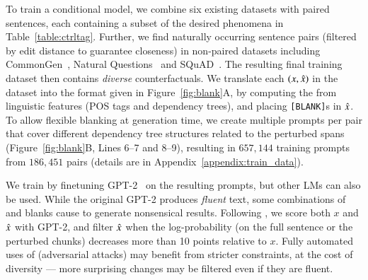 

To train a conditional model, we combine six existing datasets with paired sentences, each containing a subset of the desired phenomena in Table~\ref{table:ctrltag}. 
Further, we find naturally occurring sentence pairs (filtered by edit distance to guarantee closeness) in non-paired datasets including CommonGen~\cite{lin-etal-2020-commongen}, Natural Questions~\cite{kwiatkowski-etal-2019-natural} and SQuAD~\cite{rajpurkar-etal-2016-squad}. 
The resulting final training dataset then contains \emph{diverse} counterfactuals.
We translate each $(x, \hat{x})$ in the dataset into the format given in Figure~\ref{fig:blank}A, by computing the \tagstr from linguistic features (POS tags and dependency trees), and placing \texttt{[BLANK]}s in $\hat{x}$. 
To allow flexible blanking at generation time, we create multiple prompts per pair that cover  different dependency tree structures related to the perturbed spans (Figure~\ref{fig:blank}B, Lines 6--7 and 8--9), resulting in $657,144$ training prompts from $186,451$ pairs (details are in Appendix~\ref{appendix:train_data}).

We train \sysname by finetuning GPT-2~\cite{radford2019language} on the resulting prompts, but other LMs can also be used.
While the original GPT-2 produces \emph{fluent} text, some combinations of \tagstrs and blanks cause \sysname to generate nonsensical results.
Following \citet{morris2020textattack}, we score both $x$ and $\hat{x}$ with GPT-2, and filter $\hat{x}$ when the log-probability (on the full sentence or the perturbed chunks) decreases more than 10 points relative to $x$.
Fully automated uses of \sysname (\eg adversarial attacks) may benefit from stricter constraints, at the cost of diversity --- more surprising changes may be filtered even if they are fluent.


